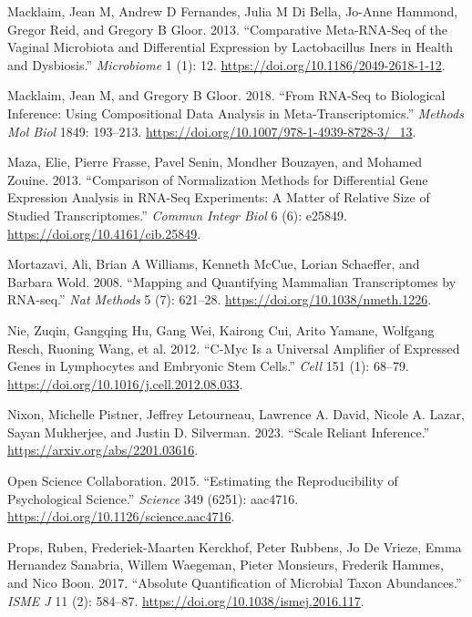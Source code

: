 \documentclass[
]{article}
\newlength{\cslhangindent}
\newlength{\cslentryspacingunit} %
\newenvironment{CSLReferences}[2] %
 {%
  \setlength{\parindent}{0pt}
  \ifodd #1
  \let\oldpar\par
  \def\par{\hangindent=\cslhangindent\oldpar}
  \fi
  \setlength{\parskip}{#2\cslentryspacingunit}
 }%
 {}
\begin{document}
\begin{CSLReferences}{1}{0}
\leavevmode{}%
Macklaim, Jean M, Andrew D Fernandes, Julia M Di Bella, Jo-Anne Hammond,
Gregor Reid, and Gregory B Gloor. 2013. {``Comparative Meta-{RNA}-Seq of
the Vaginal Microbiota and Differential Expression by Lactobacillus
Iners in Health and Dysbiosis.''} \emph{Microbiome} 1 (1): 12.
\url{https://doi.org/10.1186/2049-2618-1-12}.

\leavevmode{}%
Macklaim, Jean M, and Gregory B Gloor. 2018. {``From {RNA}-Seq to
Biological Inference: Using Compositional Data Analysis in
Meta-Transcriptomics.''} \emph{Methods Mol Biol} 1849: 193--213.
\url{https://doi.org/10.1007/978-1-4939-8728-3/_13}.

\leavevmode{}%
Maza, Elie, Pierre Frasse, Pavel Senin, Mondher Bouzayen, and Mohamed
Zouine. 2013. {``Comparison of Normalization Methods for Differential
Gene Expression Analysis in RNA-Seq Experiments: A Matter of Relative
Size of Studied Transcriptomes.''} \emph{Commun Integr Biol} 6 (6):
e25849. \url{https://doi.org/10.4161/cib.25849}.

\leavevmode{}%
Mortazavi, Ali, Brian A Williams, Kenneth McCue, Lorian Schaeffer, and
Barbara Wold. 2008. {``Mapping and Quantifying Mammalian Transcriptomes
by {RNA-seq}.''} \emph{Nat Methods} 5 (7): 621--28.
\url{https://doi.org/10.1038/nmeth.1226}.

\leavevmode{}%
Nie, Zuqin, Gangqing Hu, Gang Wei, Kairong Cui, Arito Yamane, Wolfgang
Resch, Ruoning Wang, et al. 2012. {``C-{M}yc Is a Universal Amplifier of
Expressed Genes in Lymphocytes and Embryonic Stem Cells.''} \emph{Cell}
151 (1): 68--79. \url{https://doi.org/10.1016/j.cell.2012.08.033}.

\leavevmode{}%
Nixon, Michelle Pistner, Jeffrey Letourneau, Lawrence A. David, Nicole
A. Lazar, Sayan Mukherjee, and Justin D. Silverman. 2023. {``Scale
Reliant Inference.''} \url{https://arxiv.org/abs/2201.03616}.

\leavevmode{}%
Open Science Collaboration. 2015. {``Estimating the Reproducibility of
Psychological Science.''} \emph{Science} 349 (6251): aac4716.
\url{https://doi.org/10.1126/science.aac4716}.

\leavevmode{}%
Props, Ruben, Frederiek-Maarten Kerckhof, Peter Rubbens, Jo De Vrieze,
Emma Hernandez Sanabria, Willem Waegeman, Pieter Monsieurs, Frederik
Hammes, and Nico Boon. 2017. {``Absolute Quantification of Microbial
Taxon Abundances.''} \emph{ISME J} 11 (2): 584--87.
\url{https://doi.org/10.1038/ismej.2016.117}.


\end{CSLReferences}
\end{document}
